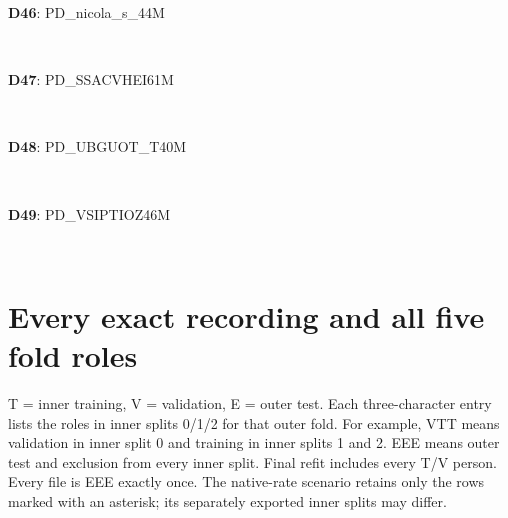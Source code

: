 \documentclass[11pt,a4paper]{article}
\begin{document}
\textbf{D46}: PD\_nicola\_s\_44M\par\begingroup\footnotesize\raggedright{}\\\par\endgroup
\textbf{D47}: PD\_SSACVHEI61M\par\begingroup\footnotesize\raggedright{}\\\par\endgroup
\textbf{D48}: PD\_UBGUOT\_T40M\par\begingroup\footnotesize\raggedright{}\\\par\endgroup
\textbf{D49}: PD\_VSIPTIOZ46M\par\begingroup\footnotesize\raggedright{}\\\par\endgroup
\clearpage\section{Every exact recording and all five fold roles}
T = inner training, V = validation, E = outer test. Each three-character entry
lists the roles in inner splits 0/1/2 for that outer fold. For example, VTT means
validation in inner split 0 and training in inner splits 1 and 2. EEE means outer
test and exclusion from every inner split. Final refit includes every T/V person.
Every file is EEE exactly once. The native-rate scenario retains only the rows
marked with an asterisk; its separately exported inner splits may differ.
\end{document}
